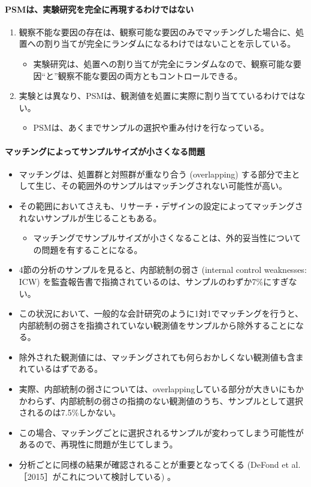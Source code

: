 \paragraph{PSMは、実験研究を完全に再現するわけではない}

\begin{enumerate}
 \item 観察不能な要因の存在は、観察可能な要因のみでマッチングした場合に、処置への割り当てが完全にランダムになるわけではないことを示している。
  \begin{itemize}
   \item 実験研究は、処置への割り当てが完全にランダムなので、観察可能な要因``と''観察不能な要因の両方ともコントロールできる。
  \end{itemize}
 \item 実験とは異なり、PSMは、観測値を処置に実際に割り当てているわけではない。
  \begin{itemize}
   \item PSMは、あくまでサンプルの選択や重み付けを行なっている。
  \end{itemize}
\end{enumerate}

\paragraph{マッチングによってサンプルサイズが小さくなる問題}
\begin{itemize}
 \item マッチングは、処置群と対照群が重なり合う (overlapping) する部分で主として生じ、その範囲外のサンプルはマッチングされない可能性が高い。
 \item その範囲においてさえも、リサーチ・デザインの設定によってマッチングされないサンプルが生じることもある。
 \begin{itemize}
  \item マッチングでサンプルサイズが小さくなることは、外的妥当性についての問題を有することになる。
 \end{itemize}
 \item 4節の分析のサンプルを見ると、内部統制の弱さ (internal control weaknesses: ICW) を監査報告書で指摘されているのは、サンプルのわずか7\%にすぎない。
 \item この状況において、一般的な会計研究のように1対1でマッチングを行うと、内部統制の弱さを指摘されていない観測値をサンプルから除外することになる。
 \item 除外された観測値には、マッチングされても何らおかしくない観測値も含まれているはずである。
 \item 実際、内部統制の弱さについては、overlappingしている部分が大きいにもかかわらず、内部統制の弱さの指摘のない観測値のうち、サンプルとして選択されるのは7.5\%しかない。
 \item この場合、マッチングごとに選択されるサンプルが変わってしまう可能性があるので、再現性に問題が生じてしまう。
 \item 分析ごとに同様の結果が確認されることが重要となってくる (DeFond et al.［2015］がこれについて検討している) 。
\end{itemize}

